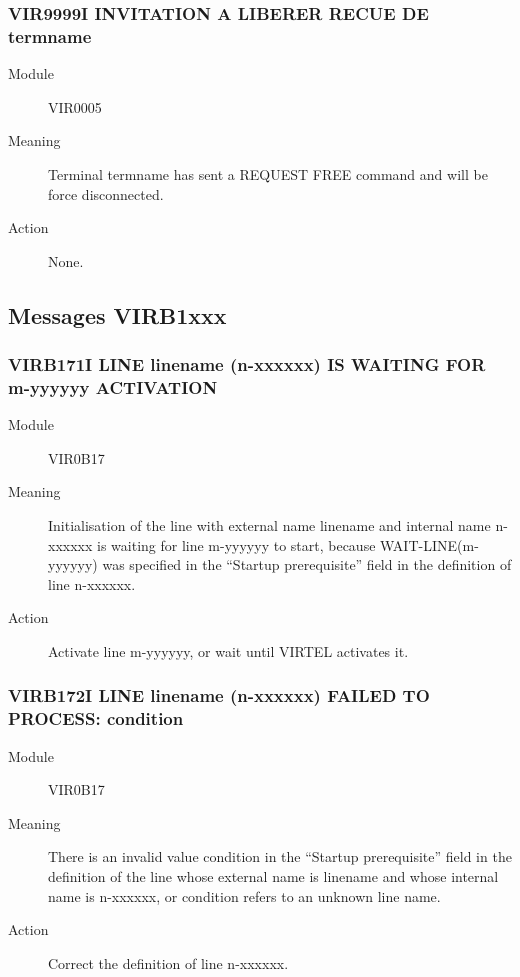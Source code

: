 \documentclass[letterpaper,10pt,english]{sphinxmanual}
\begin{document}
\subsubsection{VIR9999I INVITATION A LIBERER RECUE DE termname}
\label{\detokenize{messages:vir9999i-invitation-a-liberer-recue-de-termname}}\begin{description}
\item[{Module}] \leavevmode
VIR0005

\item[{Meaning}] \leavevmode
Terminal termname has sent a REQUEST FREE command and will be force disconnected.

\item[{Action}] \leavevmode
None.

\end{description}


\subsection{Messages VIRB1xxx}
\label{\detokenize{messages:messages-virb1xxx}}

\subsubsection{VIRB171I LINE linename (n-xxxxxx) IS WAITING FOR m-yyyyyy ACTIVATION}
\label{\detokenize{messages:virb171i-line-linename-n-xxxxxx-is-waiting-for-m-yyyyyy-activation}}\begin{description}
\item[{Module}] \leavevmode
VIR0B17

\item[{Meaning}] \leavevmode
Initialisation of the line with external name linename and internal name n-xxxxxx is waiting for line m-yyyyyy to start, because WAIT-LINE(m-yyyyyy) was specified in the “Startup prerequisite” field in the definition of line n-xxxxxx.

\item[{Action}] \leavevmode
Activate line m-yyyyyy, or wait until VIRTEL activates it.

\end{description}


\subsubsection{VIRB172I LINE linename (n-xxxxxx) FAILED TO PROCESS: condition}
\label{\detokenize{messages:virb172i-line-linename-n-xxxxxx-failed-to-process-condition}}\begin{description}
\item[{Module}] \leavevmode
VIR0B17

\item[{Meaning}] \leavevmode
There is an invalid value condition in the “Startup prerequisite” field in the definition of the line whose external name is linename and whose internal name is n-xxxxxx, or condition refers to an unknown line name.

\item[{Action}] \leavevmode
Correct the definition of line n-xxxxxx.

\end{description}
\end{document}
